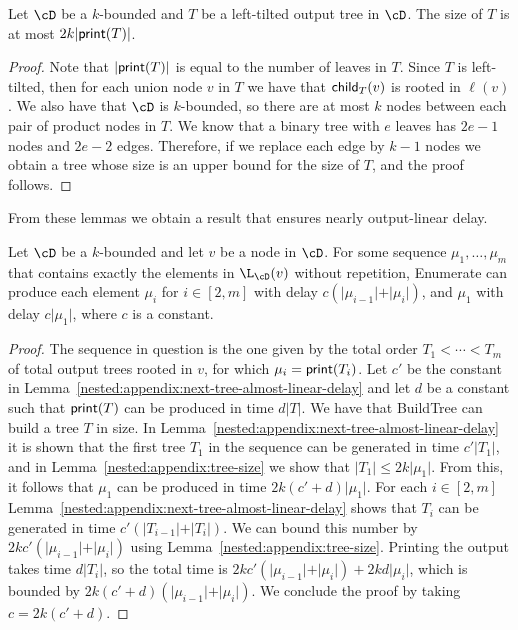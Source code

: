 \begin{lemma}\label{nested:appendix:tree-size}
	Let $\cD$ be a $k$-bounded \dsabbr and $T$ be a left-tilted output tree in $\cD$. The size of $T$ is at most $2k\vert {\sf print}(T)\vert$.
\end{lemma}
\begin{proof}
	Note that $\vert {\sf print}(T)\vert$ is equal to the number of leaves in $T$. Since $T$ is left-tilted, then  for each union node $v$ in $T$ we have that ${\sf child}_{T}(v)$ is rooted in $\ell(v)$. We also have that $\cD$ is $k$-bounded, so there are at most $k$ nodes between each pair of product nodes in $T$. We know that a binary tree with $e$ leaves has $2e-1$ nodes and $2e-2$ edges. Therefore, if we replace each edge by $k-1$ nodes we obtain a tree whose size is an upper bound for the size of $T$, and the proof follows.
\end{proof}

From these lemmas we obtain a result that ensures nearly output-linear delay.

\begin{claim}\label{nested:appendix:ds-almost-linear-delay}
	Let $\cD$ be a $k$-bounded \dsabbr and let $v$ be a node in $\cD$. For some sequence $\mu_1,\ldots,\mu_m$ that contains exactly the elements in $\L_{\cD}(v)$ without repetition, {\sc Enumerate} can produce each element $\mu_i$ for $i\in[2,m]$ with delay $c(\vert \mu_{i-1}\vert + \vert \mu_i\vert)$, and $\mu_1$ with delay $c\vert\mu_1\vert$, where $c$ is a constant.
\end{claim}
\begin{proof}
	The sequence in question is the one given by the total order $T_1<\cdots <T_m$ of total output trees rooted in $v$, for which $\mu_i = {\sf print}(T_i)$. Let $c'$ be the constant in Lemma~\ref{nested:appendix:next-tree-almost-linear-delay} and let $d$ be a constant such that ${\sf print}(T)$ can be produced in time $d\vert T \vert$. We have that {\sc BuildTree} can build a tree $T$ in size. In Lemma~\ref{nested:appendix:next-tree-almost-linear-delay} it is shown that the first tree $T_1$ in the sequence can be generated in time $c'\vert T_1\vert$, and in Lemma~\ref{nested:appendix:tree-size} we show that $\vert T_1\vert \leq 2k\vert \mu_1\vert$. From this, it follows that $\mu_1$ can be produced in time $2k(c'+d)\vert \mu_1\vert$. For each $i\in[2,m]$ Lemma~\ref{nested:appendix:next-tree-almost-linear-delay} shows that $T_i$ can be generated in time $c'(\vert T_{i-1}\vert + \vert T_i\vert)$. We can bound this number by $2kc'(\vert \mu_{i-1}\vert + \vert \mu_i\vert)$ using Lemma~\ref{nested:appendix:tree-size}. Printing the output takes time $d\vert T_i\vert$, so the total time is $2kc'(\vert \mu_{i-1}\vert + \vert \mu_i\vert) + 2kd\vert \mu_i\vert$, which is bounded by $2k(c'+d)(\vert \mu_{i-1}\vert + \vert \mu_i\vert)$. We conclude the proof by taking $c = 2k(c'+d)$.
\end{proof}

